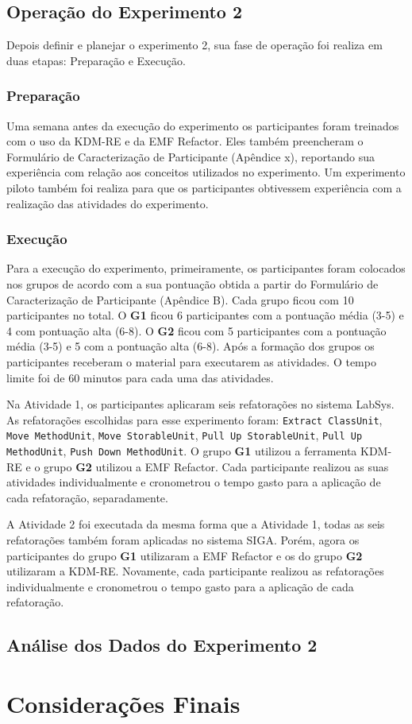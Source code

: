 \subsection{Operação do Experimento 2}

Depois definir e planejar o experimento 2, sua fase de operação foi realiza em duas etapas: Preparação e Execução.

\subsubsection{Preparação}

Uma semana antes da execução do experimento os participantes foram treinados com o uso da KDM-RE e da EMF Refactor. Eles também preencheram o Formulário de Caracterização de Participante (Apêndice x), reportando sua experiência com relação aos conceitos utilizados no experimento. Um experimento piloto também foi realiza para que os participantes obtivessem experiência com a realização das atividades do experimento.

\subsubsection{Execução}

Para a execução do experimento, primeiramente, os participantes foram colocados nos grupos de acordo com a sua pontuação obtida a partir do Formulário de Caracterização de Participante (Apêndice B). Cada grupo ficou com 10 participantes no total. O \textbf{G1} ficou 6 participantes com a pontuação média (3-5) e 4 com pontuação alta (6-8). O \textbf{G2} ficou com 5 participantes com a pontuação média (3-5) e 5 com a pontuação alta (6-8). Após a formação dos grupos os participantes receberam o material para executarem as atividades. O tempo limite foi de 60 minutos para cada uma das atividades.


Na Atividade 1, os participantes aplicaram seis refatorações no sistema LabSys. As refatorações escolhidas para esse experimento foram: \texttt{Extract ClassUnit}, \texttt{Move MethodUnit}, \texttt{Move StorableUnit}, \texttt{Pull Up StorableUnit}, \texttt{Pull Up MethodUnit}, \texttt{Push Down MethodUnit}. O grupo \textbf{G1} utilizou a ferramenta KDM-RE e o grupo \textbf{G2} utilizou a EMF Refactor. Cada participante realizou as suas atividades individualmente e cronometrou o tempo gasto para a aplicação de cada refatoração, separadamente.

A Atividade 2 foi executada da mesma forma que a Atividade 1, todas as seis refatorações também foram aplicadas no sistema SIGA. Porém, agora os participantes do grupo \textbf{G1} utilizaram a EMF Refactor e os do grupo \textbf{G2} utilizaram a KDM-RE. Novamente, cada participante realizou as refatorações individualmente e cronometrou o tempo gasto para a aplicação de cada refatoração.

\subsection{Análise dos Dados do Experimento 2}

\section{Considerações Finais}\label{sec:consideracoes_finais_experimento}